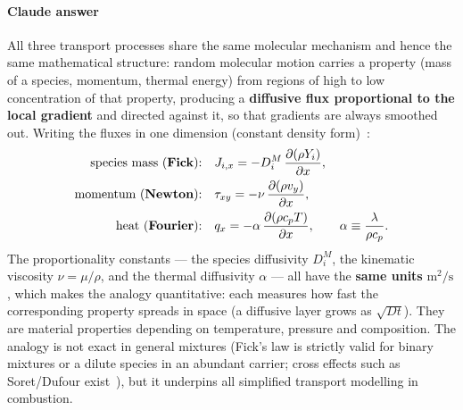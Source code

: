 {\color{istblue}
\paragraph{Claude answer}
All three transport processes share the same molecular mechanism and hence the same mathematical structure: random molecular motion carries a property (mass of a species, momentum, thermal energy) from regions of high to low concentration of that property, producing a \textbf{diffusive flux proportional to the local gradient} and directed against it, so that gradients are always smoothed out. Writing the fluxes in one dimension (constant density form)~\cite{lecture8}:
\begin{align*}
\text{species mass (\textbf{Fick}):} \quad & J_{i,x} = -D_i^M\, \frac{\partial (\rho Y_i)}{\partial x}, \\
\text{momentum (\textbf{Newton}):} \quad & \tau_{xy} = -\nu\, \frac{\partial (\rho v_y)}{\partial x}, \\
\text{heat (\textbf{Fourier}):} \quad & q_x = -\alpha\, \frac{\partial (\rho c_p T)}{\partial x}, \qquad \alpha \equiv \frac{\lambda}{\rho c_p}.
\end{align*}
The proportionality constants --- the species diffusivity $D_i^M$, the kinematic viscosity $\nu = \mu/\rho$, and the thermal diffusivity $\alpha$ --- all have the \textbf{same units} $\mathrm{m^2/s}$, which makes the analogy quantitative: each measures how fast the corresponding property spreads in space (a diffusive layer grows as $\sqrt{D t}$). They are material properties depending on temperature, pressure and composition. The analogy is not exact in general mixtures (Fick's law is strictly valid for binary mixtures or a dilute species in an abundant carrier; cross effects such as Soret/Dufour exist~\cite{warnatz2006combustion,kuo2005conservation}), but it underpins all simplified transport modelling in combustion.

}
